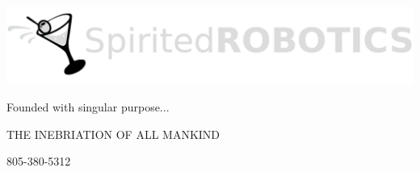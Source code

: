 \documentclass[11pt,a4paper]{memoir}
\begin{document}
\hspace{-1\parindent}\hspace{0.2mm} 
\includegraphics[width=0.8\linewidth]{spirited_robotics_logo.png}
\hspace{-1\parindent}\hspace{-0.207\linewidth} 

\vspace{2em}

Founded with singular purpose...

\hspace{0.05\linewidth}THE INEBRIATION OF ALL MANKIND



\vspace{3.8em}

\noindent\hspace{1mm}{\tiny booking@spiritedrobotics.com } 
\hfill{\tiny 805-380-5312}\hspace{1mm}
\end{document}
